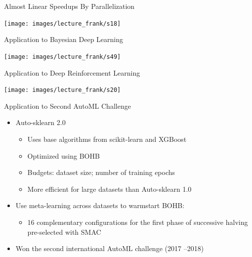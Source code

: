 {
\begin{frame}[c]{Almost Linear Speedups By Parallelization}

{\centering
	\texttt{[image: images/lecture\_frank/s18]}
}
\end{frame}
}
{
	\begin{frame}[c]{Application to Bayesian Deep Learning}
	
	{\centering
		\texttt{[image: images/lecture\_frank/s49]}
	}
\end{frame}
}
{
	\begin{frame}[c]{Application to Deep Reinforcement Learning}
	
	{\centering
		\texttt{[image: images/lecture\_frank/s20]}
	}
\end{frame}
}
\begin{frame}[c]{Application to Second AutoML Challenge}
\begin{itemize}
	\item \alert{Auto-sklearn 2.0}
	\begin{itemize}
		\item Uses base algorithms from scikit-learn and XGBoost
		\item Optimized using BOHB
		\item Budgets: dataset size; number of training epochs
		\item More efficient for large datasets than Auto-sklearn 1.0
	\end{itemize}
	\item Use \alert{meta-learning across datasets} to warmstart BOHB:
	\begin{itemize}
		\item 16 complementary configurations for the first phase of
		successive halving pre-selected with SMAC
	\end{itemize}
	\item \alert{Won the second international AutoML challenge} (2017 –2018)
\end{itemize}
\end{frame}
